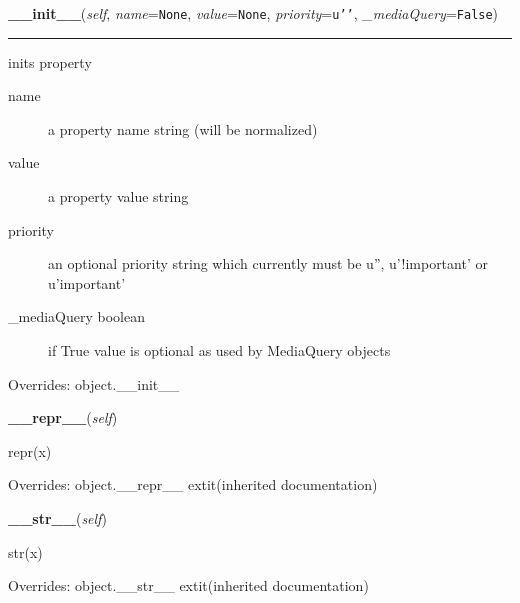     \vspace{0.5ex}

\hspace{.8\funcindent}\begin{boxedminipage}{\funcwidth}

    \raggedright \textbf{\_\_init\_\_}(\textit{self}, \textit{name}={\tt None}, \textit{value}={\tt None}, \textit{priority}={\tt \texttt{u'}\texttt{}\texttt{'}}, \textit{\_mediaQuery}={\tt False})

    \vspace{-1.5ex}

    \rule{\textwidth}{0.5\fboxrule}
\setlength{\parskip}{2ex}

inits property
\begin{description}
\item[{name}] \leavevmode 
a property name string (will be normalized)

\item[{value}] \leavevmode 
a property value string

\item[{priority}] \leavevmode 
an optional priority string which currently must be u'',
u'!important' or u'important'

\item[{{\_}mediaQuery boolean}] \leavevmode 
if True value is optional as used by MediaQuery objects

\end{description}
\setlength{\parskip}{1ex}
      Overrides: object.\_\_init\_\_

    \end{boxedminipage}

    \vspace{0.5ex}

\hspace{.8\funcindent}\begin{boxedminipage}{\funcwidth}

    \raggedright \textbf{\_\_repr\_\_}(\textit{self})

\setlength{\parskip}{2ex}
    repr(x)

\setlength{\parskip}{1ex}
      Overrides: object.\_\_repr\_\_ 	extit{(inherited documentation)}

    \end{boxedminipage}

    \vspace{0.5ex}

\hspace{.8\funcindent}\begin{boxedminipage}{\funcwidth}

    \raggedright \textbf{\_\_str\_\_}(\textit{self})

\setlength{\parskip}{2ex}
    str(x)

\setlength{\parskip}{1ex}
      Overrides: object.\_\_str\_\_ 	extit{(inherited documentation)}

    \end{boxedminipage}


